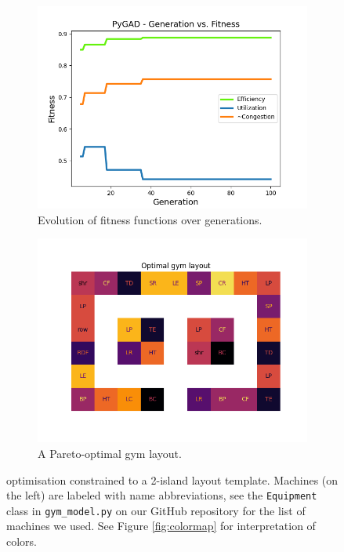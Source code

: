 \documentclass[9pt]{pnas-new}
\begin{document}
\begin{figure}[H]
	\begin{subfigure}{0.495\linewidth}
        \centering
        \includegraphics[width=\textwidth]{fitness_1.png}
        \caption{Evolution of fitness functions over generations.}\label{fig:fitness_1}
    \end{subfigure}
    \begin{subfigure}{0.495\linewidth}
        \centering
        \includegraphics[width=\textwidth]{layout_1.png}
        \caption{A Pareto-optimal gym layout. }\label{fig:layout_1}
    \end{subfigure}
    \caption{optimisation constrained to a 2-island layout template. Machines (on the left) are labeled with name abbreviations, see the \texttt{Equipment} class in \texttt{gym\_model.py} on our GitHub repository \cite{gymulator} for the list of machines we used. See Figure \ref{fig:colormap} for interpretation of colors.}\label{fig:firstTest}
\end{figure}
\end{document}
